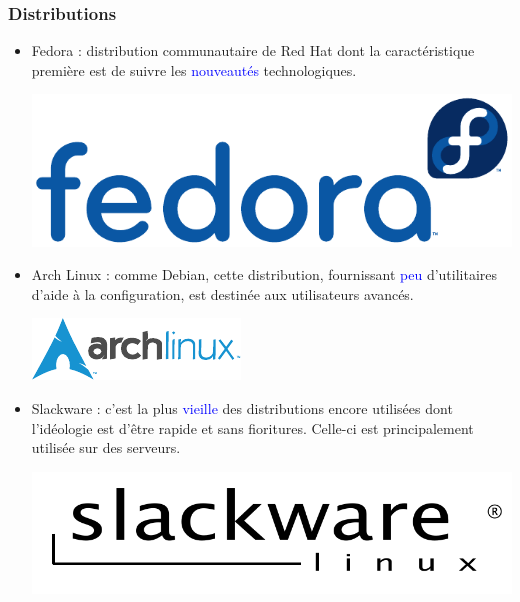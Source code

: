 \documentclass[aspectratio=169]{beamer}
\begin{document}
\begin{frame}
\frametitle{Distributions}
\begin{itemize}
  \item Fedora : distribution communautaire de Red Hat dont la caractéristique
première est de suivre les \textcolor{blue}{nouveautés} technologiques.

    \begin{center}
      \includegraphics[scale=0.2]
      {textures/images/unix/logos/fedora.pdf}
    \end{center}

  \item Arch Linux : comme Debian, cette distribution, fournissant
\textcolor{blue}{peu} d'utilitaires d'aide à la configuration, est destinée aux
utilisateurs avancés.

    \begin{center}
      \includegraphics[scale=0.6]
      {textures/images/unix/logos/archlinux.pdf}
    \end{center}

  \item Slackware : c'est la plus \textcolor{blue}{vieille} des distributions
    encore utilisées dont l'idéologie est d'être rapide et sans fioritures.
    Celle-ci est principalement utilisée sur des serveurs.

    \begin{center}
      \includegraphics[scale=0.2]
      {textures/images/unix/logos/slackware.pdf}
    \end{center}
\end{itemize}
\end{frame}
\end{document}
